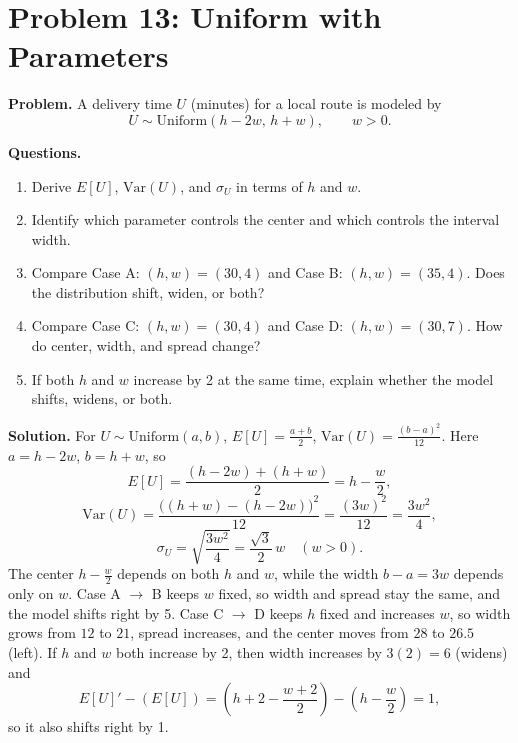 \section{Problem 13: Uniform with Parameters}

\textbf{Problem.}
A delivery time \(U\) (minutes) for a local route is modeled by
\[
U\sim \text{Uniform}(h-2w,\,h+w),\qquad w>0.
\]

\textbf{Questions.}
\begin{enumerate}
  \item Derive \(E[U]\), \(\mathrm{Var}(U)\), and \(\sigma_U\) in terms of \(h\) and \(w\).
  \item Identify which parameter controls the center and which controls the interval width.
  \item Compare Case A: \((h,w)=(30,4)\) and Case B: \((h,w)=(35,4)\). Does the distribution shift, widen, or both?
  \item Compare Case C: \((h,w)=(30,4)\) and Case D: \((h,w)=(30,7)\). How do center, width, and spread change?
  \item If both \(h\) and \(w\) increase by 2 at the same time, explain whether the model shifts, widens, or both.
\end{enumerate}

\textbf{Solution.}
For \(U\sim\text{Uniform}(a,b)\), \(E[U]=\frac{a+b}{2}\), \(\mathrm{Var}(U)=\frac{(b-a)^2}{12}\).
Here \(a=h-2w\), \(b=h+w\), so
\[
E[U]=\frac{(h-2w)+(h+w)}{2}=h-\frac{w}{2},
\]
\[
\mathrm{Var}(U)=\frac{\big((h+w)-(h-2w)\big)^2}{12}=\frac{(3w)^2}{12}=\frac{3w^2}{4},
\]
\[
\sigma_U=\sqrt{\frac{3w^2}{4}}=\frac{\sqrt{3}}{2}\,w \quad (w>0).
\]
The center \(h-\frac{w}{2}\) depends on both \(h\) and \(w\), while the width \(b-a=3w\) depends only on \(w\).
Case A \(\to\) B keeps \(w\) fixed, so width and spread stay the same, and the model shifts right by 5.
Case C \(\to\) D keeps \(h\) fixed and increases \(w\), so width grows from \(12\) to \(21\), spread increases, and the center moves from \(28\) to \(26.5\) (left).
If \(h\) and \(w\) both increase by 2, then width increases by \(3(2)=6\) (widens) and
\[
E[U]'-(E[U])=\left(h+2-\frac{w+2}{2}\right)-\left(h-\frac{w}{2}\right)=1,
\]
so it also shifts right by 1.
\begin{center}
\end{center}

